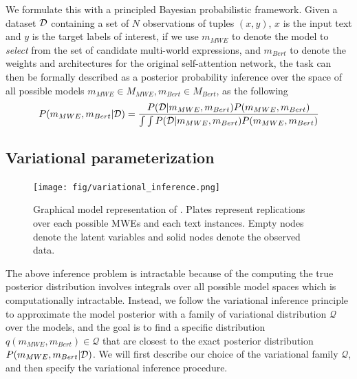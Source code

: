 We formulate this with a principled Bayesian probabilistic framework. 
Given a dataset $\mathcal{D}$ containing a set of $N$ observations of tuples $(x,y)$,  $x$ is the input text and $y$ is the target labels of interest,
if we use  $m_{MWE}$ to denote the model to \textit{select} from the set of candidate multi-world expressions, and 
$m_{Bert}$ to denote the weights and architectures for the original self-attention network, the task can then be formally described as a posterior probability inference over the space of all possible models $m_{MWE} \in M_{MWE}, m_{Bert} \in M_{Bert}$, as the following
\begin{align*}
\small
\begin{split}
    P(m_{MWE}, m_{Bert} | \mathcalD) = \frac{  P( \mathcalD | m_{MWE}, m_{Bert} ) P(m_{MWE}, m_{Bert})  }{ \int \int P( \mathcalD | m_{MWE}, m_{Bert} ) P(m_{MWE}, m_{Bert}) }\\
\end{split}
\end{align*}


\subsection{Variational parameterization}\label{sec:var-param}


\begin{figure}[tb]
    \centering
    \texttt{[image: fig/variational\_inference.png]}
    \vspace{20pt}
    \caption{Graphical model representation of \BertMWE. Plates represent replications over each possible MWEs and each text  instances. Empty nodes denote the latent variables and solid nodes denote the observed data. }
    \label{fig:variational}
\end{figure}


The above inference problem is intractable because of the computing the true posterior distribution involves integrals over all possible model spaces which is computationally intractable. 
Instead, we follow the variational inference principle \cite{ranganath2014black} to approximate the model posterior with a family of variational distribution $\mathcal{Q}$ over the models, and the goal is to find a specific distribution $q(m_{MWE}, m_{Bert}) \in \mathcal{Q}$ that are closest to the exact posterior distribution $P(m_{MWE}, m_{Bert} | \mathcal{D})$.
We will first describe our choice of the variational family $\mathcal{Q}$, and then  specify the variational inference procedure.


